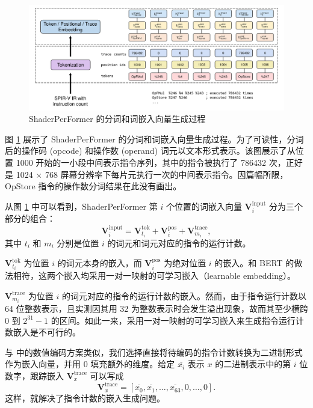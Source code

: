 \begin{figure}[h]
  \centering
  \includegraphics[width=1\linewidth]{figures/tokandembed.pdf}
  \caption{ShaderPerFormer 的分词和词嵌入向量生成过程}
  \label{fig:spf_embedding}
\end{figure}

图 \ref{fig:spf_embedding} 展示了 ShaderPerFormer 的分词和词嵌入向量生成过程。为了可读性，分词后的操作码 (opcode) 和操作数 (operand) 词元以文本形式表示。该图展示了从位置 1000 开始的一小段中间表示指令序列，其中的指令被执行了 786432 次，正好是 1024 $\times$ 768 屏幕分辨率下每片元执行一次的中间表示指令。因篇幅所限，OpStore 指令的操作数分词结果在此没有画出。

从图 \ref{fig:spf_embedding} 中可以看到，ShaderPerFormer 第 $ i $ 个位置的词嵌入向量 $ \mathbf{V}^{\text{input}}_i $ 分为三个部分的组合：
\begin{equation}
\mathbf{V}^{\text{input}}_i = \mathbf{V}^\text{tok}_{t_i} +\mathbf{V}^\text{pos}_i + \mathbf{V}^\text{trace}_{m_i},
\end{equation}
其中 $t_i$ 和 $m_i$ 分别是位置 $i$ 的词元和词元对应的指令的运行计数。

$ \mathbf{V}^\text{tok}_{t_i} $ 为位置 $i$ 的词元本身的嵌入，而 $\mathbf{V}^\text{pos}_i$ 为绝对位置 $ i $ 的嵌入。和 BERT 的做法相符，这两个嵌入均采用一对一映射的可学习嵌入（learnable embedding）。

$ \mathbf{V}^\text{trace}_{m_i} $ 为位置 $i$ 的词元对应的指令的运行计数的嵌入。然而，由于指令运行计数以 64 位整数表示，且实测因其用 32 为整数表示时会发生溢出现象，故而其至少横跨 0 到 $2^{31} - 1$ 的区间。如此一来，采用一对一映射的可学习嵌入来生成指令运行计数嵌入是不可行的。

与 \citet{Born2023} 中的数值编码方案类似，我们选择直接将待编码的指令计数转换为二进制形式作为嵌入向量，并用 0 填充额外的维度。给定 $\overline{x_i}$ 表示 $x$ 的二进制表示中的第 $i$ 位数字，跟踪嵌入 $\mathbf{V}^{\text{trace}}_x$ 可以写成
\begin{equation}
\mathbf{V}^{\text{trace}}_x = [\overline{x_0}, \overline{x_1}, \dots, \overline{x_{63}}, 0, \dots, 0].
\end{equation}
这样，就解决了指令计数的嵌入生成问题。

